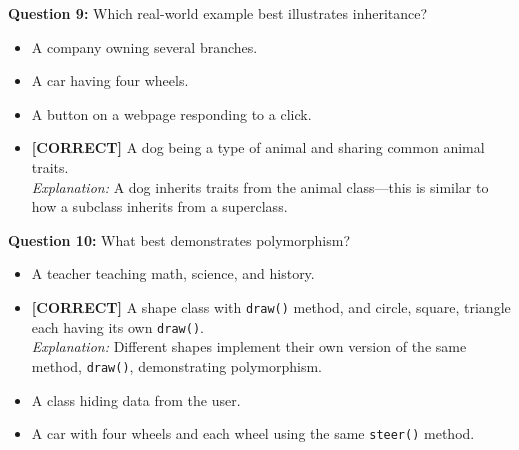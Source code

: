 \noindent
\textbf{Question 9:} Which real-world example best illustrates inheritance?
\\[0.2cm]
\begin{itemize}
 \item A company owning several branches.
 \item A car having four wheels.
 \item A button on a webpage responding to a click.
 \item \textbf{[CORRECT]} A dog being a type of animal and sharing common animal traits.
\\[0.1cm]
\textit{Explanation:} 
A dog inherits traits from the animal class---this is similar to how a subclass inherits from a superclass.
\end{itemize}
\vspace{0.3cm}
\noindent
\textbf{Question 10:} What best demonstrates polymorphism?
\\[0.2cm]
\begin{itemize}
 \item A teacher teaching math, science, and history.
 \item \textbf{[CORRECT]} A shape class with \texttt{draw()} method, and circle, square, triangle each having its own \texttt{draw()}.
\\[0.1cm]
\textit{Explanation:} 
Different shapes implement their own version of the same method, \texttt{draw()}, demonstrating polymorphism.
 \item A class hiding data from the user.
 \item A car with four wheels and each wheel using the same \texttt{steer()} method.
\end{itemize}




